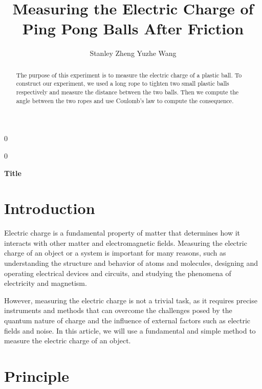 \documentclass[12pt]{article}
\newcommand{\blind}{0}
\begin{document}

%

\def\spacingset#1{\renewcommand{\baselinestretch}%
{#1}\small\normalsize} \spacingset{1}



\blind
{
  \title{\bf Measuring the Electric Charge of Ping Pong Balls After Friction }
  \author{Stanley Zheng \quad Yuzhe Wang}
  \maketitle
} \fi

\blind
{
  \bigskip
  \bigskip
  \bigskip
  \begin{center}
    {\LARGE\bf Title}
\end{center}
  \medskip
} \fi

\bigskip
\begin{abstract}
The purpose of this experiment is to measure the electric charge of a plastic ball. To construct our experiment, we used a long rope to tighten two small plastic balls respectively and measure the distance between the two balls. Then we compute the angle between the two ropes and use Coulomb's law to compute the consequence.
\end{abstract}


\spacingset{1.45}
\section{Introduction}
\label{sec:intro}

Electric charge is a fundamental property of matter that determines how it interacts with other matter and electromagnetic fields. Measuring the electric charge of an object or a system is important for many reasons, such as understanding the structure and behavior of atoms and molecules, designing and operating electrical devices and circuits, and studying the phenomena of electricity and magnetism. 

However, measuring the electric charge is not a trivial task, as it requires precise instruments and methods that can overcome the challenges posed by the quantum nature of charge and the influence of external factors such as electric fields and noise. In this article, we will use a fundamental and simple method to measure the electric charge of an object.


\section{Principle}
\end{document}
